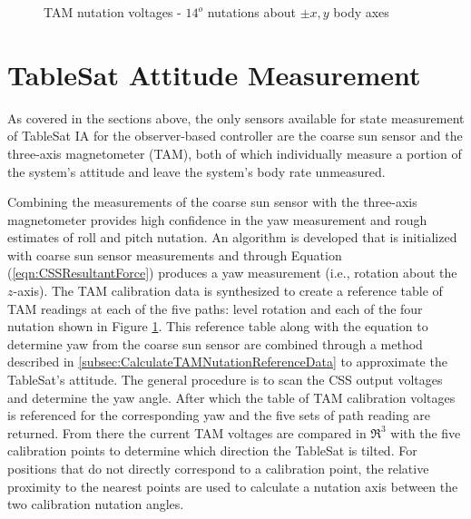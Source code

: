 \begin{figure}[H]
  \centerline{}
  \caption{TAM nutation voltages - $14^o$ nutations about $\pm x,y$ body axes}
  \label{fig:TAMNutationVoltages}
\end{figure}

\section{TableSat Attitude Measurement}
\label{subsec:StateMeasurement}

As covered in the sections above, the only sensors available for state measurement of TableSat IA for the observer-based controller are the coarse sun sensor and the three-axis magnetometer (TAM), both of which individually measure a portion of the system's attitude and leave the system's body rate unmeasured.

Combining the measurements of the coarse sun sensor with the three-axis magnetometer provides high confidence in the yaw measurement and rough estimates of roll and pitch nutation.  An algorithm is developed that is initialized with coarse sun sensor measurements and through Equation (\ref{eqn:CSSResultantForce}) produces a yaw measurement (i.e., rotation about the $z$-axis).  The TAM calibration data is synthesized to create a reference table of TAM readings at each of the five paths: level rotation and each of the four nutation shown in Figure \ref{fig:TAMNutationVoltages}.  This reference table along with the equation to determine yaw from the coarse sun sensor are combined through a method described in \ref{subsec:CalculateTAMNutationReferenceData} to approximate the TableSat's attitude.  The general procedure is to scan the CSS output voltages and determine the yaw angle.  After which the table of TAM calibration voltages is referenced for the corresponding yaw and the five sets of path reading are returned.  From there the current TAM voltages are compared in $\Re^3$ with the five calibration points to determine which direction the TableSat is tilted.  For positions that do not directly correspond to a calibration point, the relative proximity to the nearest points are used to calculate a nutation axis between the two calibration nutation angles.
